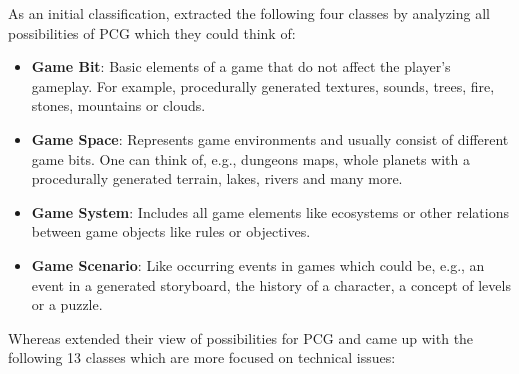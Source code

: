 \documentclass[MGS,Master,english]{twbook}%
\begin{document}
As an initial classification, \citep{pcg::survey} extracted the following four classes by analyzing all possibilities of \ac{PCG} which they could think of:
\begin{itemize}
	\item \textbf{Game Bit}: Basic elements of a game that do not affect the player's gameplay. For example, procedurally generated textures, sounds, trees, fire, stones, mountains or clouds. \cite{pcg::survey}
	\item \textbf{Game Space}: Represents game environments and usually consist of different game bits. One can think of, e.g., dungeons maps, whole planets with a procedurally generated terrain, lakes, rivers and many more. \cite{pcg::survey}
	\item \textbf{Game System}: Includes all game elements like ecosystems or other relations between game objects like rules or objectives. \cite{pcg::survey}
	\item \textbf{Game Scenario}: Like occurring events in games which could be, e.g., an event in a generated storyboard, the history of a character, a concept of levels or a puzzle. \cite{pcg::survey}
\end{itemize}
Whereas \citep{pcg::book} extended their view of possibilities for \ac{PCG} and came up with the following 13 classes which are more focused on technical issues:
\end{document}
